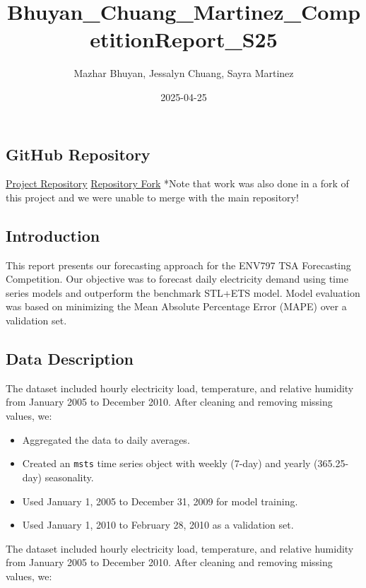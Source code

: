 \documentclass[
]{article}
\title{Bhuyan\_Chuang\_Martinez\_CompetitionReport\_S25}
\author{Mazhar Bhuyan, Jessalyn Chuang, Sayra Martinez}
\date{2025-04-25}
\providecommand{\tightlist}{%
  \setlength{\itemsep}{0pt}\setlength{\parskip}{0pt}}
\begin{document}
\maketitle

{
\setcounter{tocdepth}{2}
\tableofcontents
}
\subsection{GitHub Repository}\label{github-repository}

\href{https://github.com/jessalynlc/BhuyanChuangMartinez_ENV797_TSA_ForecastCompetition_S25}{Project
Repository}
\href{https://github.com/MazharBhuyan/BhuyanChuangMartinez_ENV797_TSA_ForecastCompetition_S25}{Repository
Fork} *Note that work was also done in a fork of this project and we
were unable to merge with the main repository!

\subsection{Introduction}\label{introduction}

This report presents our forecasting approach for the ENV797 TSA
Forecasting Competition. Our objective was to forecast daily electricity
demand using time series models and outperform the benchmark STL+ETS
model. Model evaluation was based on minimizing the Mean Absolute
Percentage Error (MAPE) over a validation set.

\subsection{Data Description}\label{data-description}

The dataset included hourly electricity load, temperature, and relative
humidity from January 2005 to December 2010. After cleaning and removing
missing values, we:

\begin{itemize}
\tightlist
\item
  Aggregated the data to daily averages.
\item
  Created an \texttt{msts} time series object with weekly (7-day) and
  yearly (365.25-day) seasonality.
\item
  Used January 1, 2005 to December 31, 2009 for model training.
\item
  Used January 1, 2010 to February 28, 2010 as a validation set.
\end{itemize}

The dataset included hourly electricity load, temperature, and relative
humidity from January 2005 to December 2010. After cleaning and removing
missing values, we:
\end{document}
